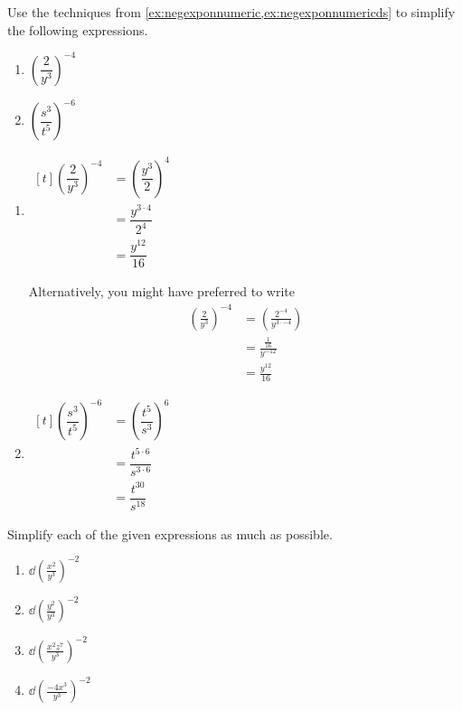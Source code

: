 \begin{myexample}
Use the techniques from \cref{ex:negexponnumeric,ex:negexponnumericds} to simplify the following expressions.
\begin{multicols}{2}
\begin{enumerate}
	\item $\left(\dfrac{2}{y^3}\right)^{-4}$
    \item $\left( \dfrac{s^3}{t^5} \right)^{-6}$
\end{enumerate}
\end{multicols}
\end{myexample}
\begin{myProof}
  \begin{enumerate}
    \item 
      $\begin{aligned}[t]
	\left(\dfrac{2}{y^3}\right)^{-4} & = \left(\dfrac{y^3}{2}\right)^{4} \\
    & = \dfrac{y^{3\cdot 4}}{2^4}\\
    &= \dfrac{y^{12}}{16}
      \end{aligned}$

      Alternatively, you might have preferred to write
      \begin{align*}
        \left(\frac{2}{y^3}\right)^{-4} & = \left(\frac{2^{-4}}{y^{3\cdot -4}}\right) \\
        & = \frac{\frac{1}{16}}{y^{-12}}\\
    &= \frac{y^{12}}{16}
      \end{align*}
    \item
      $
      \begin{aligned}[t]
    \left( \dfrac{s^3}{t^5} \right)^{-6} & =  \left( \dfrac{t^5}{s^3} \right)^{6}\\
    & = \dfrac{t^{5\cdot 6}}{s^{3\cdot 6}} \\
    & = \dfrac{t^{30}}{s^{18}}
      \end{aligned}
      $
  \end{enumerate}
\end{myProof}

\begin{myexample}
  Simplify each of the given expressions as much as possible.
\drillandskill
\begin{multicols}{2}
	\begin{enumerate}
		\item $\dd\left( \frac{x^2}{y^3}\right)^{-2}$
		\item $\dd\left( \frac{y^2}{y^3}\right)^{-2}$
		\item $\dd\left( \frac{x^2z^7}{y^3}\right)^{-2}$
		\item $\dd\left( \frac{-4x^3}{y^3}\right)^{-2}$
	\end{enumerate}
\end{multicols}
\end{myexample}


